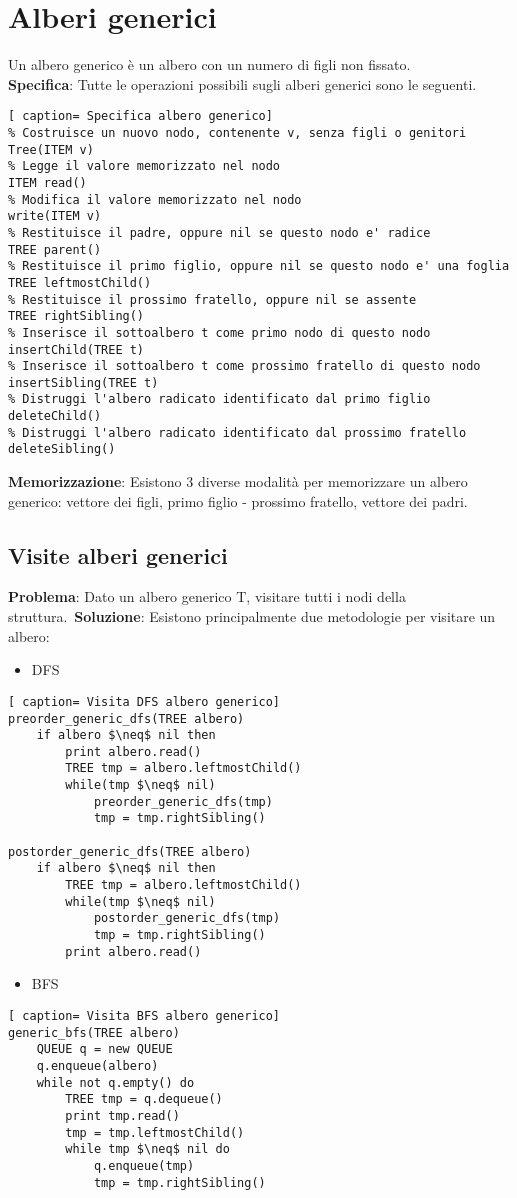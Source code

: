 \documentclass[../cheatSheetAlgoritmi.tex]{subfiles}
\begin{document}
\section{Alberi generici}
Un albero generico è un albero con un numero di figli non fissato.\\
\textbf{Specifica}: Tutte le operazioni possibili sugli alberi generici sono le seguenti. 
\begin{lstlisting}[ caption= Specifica albero generico]
% Costruisce un nuovo nodo, contenente v, senza figli o genitori
Tree(ITEM v)
% Legge il valore memorizzato nel nodo
ITEM read()
% Modifica il valore memorizzato nel nodo
write(ITEM v)
% Restituisce il padre, oppure nil se questo nodo e' radice
TREE parent()
% Restituisce il primo figlio, oppure nil se questo nodo e' una foglia
TREE leftmostChild()
% Restituisce il prossimo fratello, oppure nil se assente
TREE rightSibling()
% Inserisce il sottoalbero t come primo nodo di questo nodo
insertChild(TREE t)
% Inserisce il sottoalbero t come prossimo fratello di questo nodo
insertSibling(TREE t)
% Distruggi l'albero radicato identificato dal primo figlio
deleteChild()
% Distruggi l'albero radicato identificato dal prossimo fratello
deleteSibling()
\end{lstlisting}
\textbf{Memorizzazione}: Esistono 3 diverse modalità per memorizzare un albero generico: vettore dei figli, primo figlio - prossimo fratello, vettore dei padri.\
\newpage

\subsection{Visite alberi generici}
\textbf{Problema}: Dato un albero generico T, visitare tutti i nodi della struttura.\
\textbf{Soluzione}: Esistono principalmente due metodologie per visitare un albero:
\begin{itemize}
	\item DFS
\end{itemize}
\begin{lstlisting}[ caption= Visita DFS albero generico]
preorder_generic_dfs(TREE albero)
	if albero $\neq$ nil then
		print albero.read()
		TREE tmp = albero.leftmostChild()
		while(tmp $\neq$ nil)
			preorder_generic_dfs(tmp)
			tmp = tmp.rightSibling()
    
postorder_generic_dfs(TREE albero)
	if albero $\neq$ nil then
		TREE tmp = albero.leftmostChild()
		while(tmp $\neq$ nil)
			postorder_generic_dfs(tmp)
			tmp = tmp.rightSibling()
		print albero.read()
\end{lstlisting}
\begin{itemize}
 	\item BFS
\end{itemize}
\begin{lstlisting}[ caption= Visita BFS albero generico]
generic_bfs(TREE albero)
	QUEUE q = new QUEUE
	q.enqueue(albero)
	while not q.empty() do
		TREE tmp = q.dequeue()
		print tmp.read()
		tmp = tmp.leftmostChild()
		while tmp $\neq$ nil do
			q.enqueue(tmp)
			tmp = tmp.rightSibling()
\end{lstlisting}
\newpage
\end{document}
